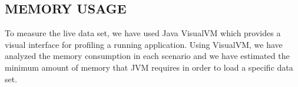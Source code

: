 \documentclass[a4paper,twoside]{article}
\begin{document}
%
%



\subsection{\uppercase{Memory Usage}}
\label{subsec:memusage}
To measure the live data set, we have used Java VisualVM \cite{visualvm:oracle} which provides a visual interface for profiling a running application. Using VisualVM, we have analyzed the memory consumption in each scenario and we have estimated the minimum amount of memory that JVM requires in order to load a specific data set.
\end{document}
